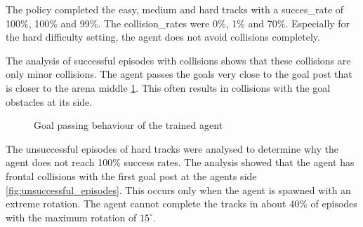 The policy completed the easy, medium and hard tracks with a succes\_rate of 100\%, 100\% and 99\%. 
The collision\_rates were 0\%, 1\% and  70\%. Especially for the hard difficulty setting, the agent does not avoid collisions completely. 

The analysis of successful episodes with collisions shows that these collisions are only minor collisions. The agent passes the goals very close to the goal post that is closer to the arena middle \ref{fig:agent_behaviour}. This often results in collisions with the goal obstacles at its side.

\begin{figure}
    \centering
    \caption{Goal passing behaviour of the trained agent}
    \label{fig:agent_behaviour}
\end{figure}

The unsuccessful episodes of hard tracks were analysed to determine why the agent does not reach 100\% success rates. The analysis showed that the agent has frontal collisions with the first goal post at the agents side \ref{fig:unsuccessful_episodes}. This occurs only when the agent is spawned with an extreme rotation. The agent cannot complete the tracks in about 40\% of episodes with the maximum rotation of $15^{\circ}$.

